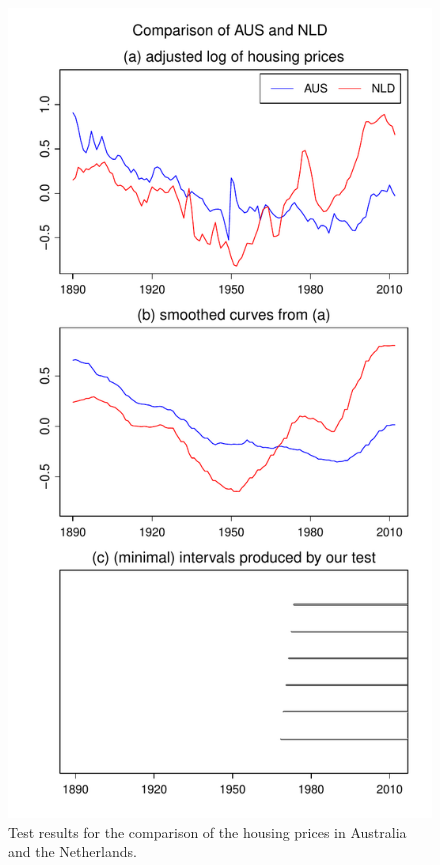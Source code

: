 \documentclass[a4paper,12pt]{article}
\begin{document}
\begin{figure}[b!]
\begin{minipage}[t]{0.49\textwidth}
\includegraphics[width=\textwidth]{output/plots/hp/hp_AUS_vs_NLD}
\caption{Test results for the comparison of the housing prices in Australia and the Netherlands.}\label{fig:hp:Australia:Netherlands}
\end{minipage}

\end{figure}
\end{document}
